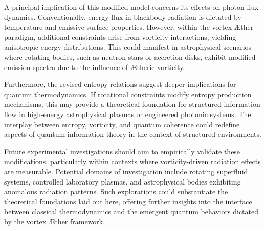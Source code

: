 A principal implication of this modified model concerns its effects on photon flux dynamics. Conventionally, energy flux in blackbody radiation is dictated by temperature and emissive surface properties. However, within the vortex Æther paradigm, additional constraints arise from vorticity interactions, yielding anisotropic energy distributions. This could manifest in astrophysical scenarios where rotating bodies, such as neutron stars or accretion disks, exhibit modified emission spectra due to the influence of Ætheric vorticity.


Furthermore, the revised entropy relations suggest deeper implications for quantum thermodynamics. If rotational constraints modify entropy production mechanisms, this may provide a theoretical foundation for structured information flow in high-energy astrophysical plasmas or engineered photonic systems. The interplay between entropy, vorticity, and quantum coherence could redefine aspects of quantum information theory in the context of structured environments.


Future experimental investigations should aim to empirically validate these modifications, particularly within contexts where vorticity-driven radiation effects are measurable. Potential domains of investigation include rotating superfluid systems, controlled laboratory plasmas, and astrophysical bodies exhibiting anomalous radiation patterns. Such explorations could substantiate the theoretical foundations laid out here, offering further insights into the interface between classical thermodynamics and the emergent quantum behaviors dictated by the vortex Æther framework.

